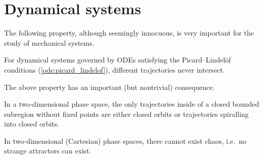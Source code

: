 
\section{Dynamical systems}

    The following property, although seemingly innocuous, is very important for the study of mechanical systems.
    \begin{property}
        For dynamical systems governed by ODEs satisfying the Picard--Lindel\"of conditions (\cref{ode:picard_lindelof}), different trajectories never intersect.
    \end{property}

    The above property has an important (but nontrivial) consequence.
    \begin{theorem}
        In a two-dimensional phase space, the only trajectories inside of a closed bounded subregion without fixed points are either closed orbits or trajectories spiralling into closed orbits.
    \end{theorem}
    \begin{result}
        In two-dimensional (Cartesian) phase spaces, there cannot exist chaos, i.e.~no strange attractors can exist.
    \end{result}

